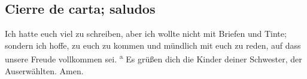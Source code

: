 \hypertarget{cierre-de-carta-saludos}{%
\subsection{Cierre de carta; saludos}\label{cierre-de-carta-saludos}}

 Ich hatte euch viel zu schreiben, aber ich wollte nicht
mit Briefen und Tinte; sondern ich hoffe, zu euch zu kommen und mündlich
mit euch zu reden, auf dass unsere Freude vollkommen sei.
\textsuperscript{a}  Es grüßen dich die Kinder deiner
Schwester, der Auserwählten. Amen.
